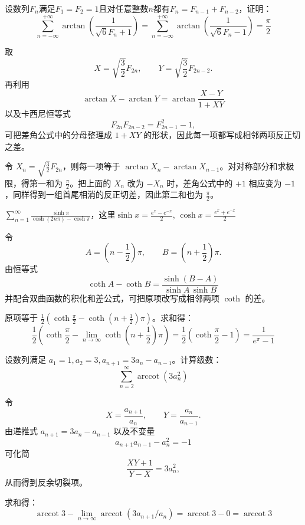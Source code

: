 \begin{example}[$\sum_{n=-\infty}^{+\infty} \arctan\left(\frac{1}{\sqrt{6}F_n + 1}\right)$]
    设数列\(F_n\)满足\(F_1 = F_2 = 1\)且对任意整数\(n\)都有\(F_n = F_{n-1} + F_{n-2}\)，证明：
    $$\sum_{n=-\infty}^{+\infty} \arctan\left(\frac{1}{\sqrt{6}F_n + 1}\right) = \sum_{n=-\infty}^{+\infty} \arctan\left(\frac{1}{\sqrt{6}F_n - 1}\right) = \frac{\pi}{2}$$
\end{example}
\begin{solution}
取
\[
X=\sqrt{\frac{3}{2}}F_{2n},\qquad Y=\sqrt{\frac{3}{2}}F_{2n-2}.
\]
再利用
\[
\arctan X-\arctan Y=\arctan\frac{X-Y}{1+XY}
\]
以及卡西尼恒等式
\[
F_{2n}F_{2n-2}=F_{2n-1}^2-1,
\]
可把差角公式中的分母整理成 \(1+XY\) 的形状，因此每一项都写成相邻两项反正切之差。

令 \( X_n = \sqrt{\frac{3}{2}}F_{2n} \)，则每一项等于 \(\arctan X_n - \arctan X_{n-1}\)。对对称部分和求极限，得第一和为 \(\frac{\pi}{2}\)。把上面的 \(X_n\) 改为 \(-X_n\) 时，差角公式中的 \(+1\) 相应变为 \(-1\)，同样得到一组首尾相消的反正切差，因此第二和也为 \(\frac{\pi}{2}\)。
\end{solution}

\begin{example}
\(\displaystyle\sum_{n=1}^{\infty}\frac{\sinh\pi}{\cosh(2n\pi)-\cosh\pi}\)，这里\(\sinh x=\frac{e^x-e^{-x}}{2}\), \(\cosh x=\frac{e^x+e^{-x}}{2}\)
\end{example}
\begin{solution}
令
\[
A=\left(n-\frac12\right)\pi,\qquad B=\left(n+\frac12\right)\pi.
\]
由恒等式
\[
\coth A-\coth B=\frac{\sinh(B-A)}{\sinh A\,\sinh B}
\]
并配合双曲函数的积化和差公式，可把原项改写成相邻两项 \(\coth\) 的差。

原项等于 \(\frac{1}{2}(\coth\frac{\pi}{2} - \coth(n+\frac{1}{2})\pi)\)。求和得：
\[
\frac{1}{2}\left(\coth\frac{\pi}{2} - \lim_{n\to\infty}\coth\left(n+\frac{1}{2}\right)\pi\right) = \frac{1}{2}\left(\coth\frac{\pi}{2} - 1\right) = \frac{1}{e^\pi - 1}
\]

\end{solution}

\begin{example}[$\sum_{n=2}^{\infty} \operatorname{arccot} (3a_n^2) $]
设数列满足 \(a_1=1, a_2=3, a_{n+1} = 3a_n - a_{n-1}\)。计算级数：$$ \sum_{n=2}^{\infty} \operatorname{arccot} (3a_n^2) $$
\end{example}
\begin{solution}
令
\[
X=\frac{a_{n+1}}{a_n},\qquad Y=\frac{a_n}{a_{n-1}}.
\]
由递推式 \(a_{n+1}=3a_n-a_{n-1}\) 以及不变量
\[
a_{n+1}a_{n-1}-a_n^2=-1
\]
可化简
\[
\frac{XY+1}{Y-X}=3a_n^2,
\]
从而得到反余切裂项。

求和得：
\[
\operatorname{arccot} 3 - \lim_{n\to\infty} \operatorname{arccot} (3a_{n+1}/a_n) = \operatorname{arccot} 3 - 0 = \operatorname{arccot} 3
\]

\end{solution}


